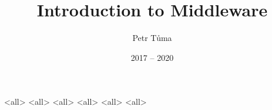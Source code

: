 %

\title[Introduction to Middleware]{Introduction to Middleware}
\author{Petr Tůma}
\date{2017 -- 2020}


  \frame{\titlepage}
  \tableofcontents

  \mode<all>{}
  \mode<all>{}
  \mode<all>{}
  \mode<all>{}
  \mode<all>{}
  \mode<all>{}

